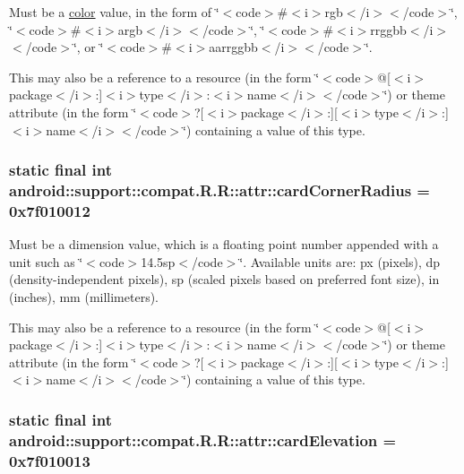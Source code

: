 Must be a \hyperlink{classandroid_1_1support_1_1compat_1_1_r_1_1color}{color} value, in the form of \char`\"{}$<$code$>$\#$<$i$>$rgb$<$/i$>$$<$/code$>$\char`\"{}, \char`\"{}$<$code$>$\#$<$i$>$argb$<$/i$>$$<$/code$>$\char`\"{}, \char`\"{}$<$code$>$\#$<$i$>$rrggbb$<$/i$>$$<$/code$>$\char`\"{}, or \char`\"{}$<$code$>$\#$<$i$>$aarrggbb$<$/i$>$$<$/code$>$\char`\"{}. 

This may also be a reference to a resource (in the form \char`\"{}$<$code$>$@\mbox{[}$<$i$>$package$<$/i$>$:\mbox{]}$<$i$>$type$<$/i$>$:$<$i$>$name$<$/i$>$$<$/code$>$\char`\"{}) or theme attribute (in the form \char`\"{}$<$code$>$?\mbox{[}$<$i$>$package$<$/i$>$:\mbox{]}\mbox{[}$<$i$>$type$<$/i$>$:\mbox{]}$<$i$>$name$<$/i$>$$<$/code$>$\char`\"{}) containing a value of this type. \hypertarget{classandroid_1_1support_1_1compat_1_1_r_1_1attr_078532727d38405f086f9c84c9c5c24a}{
\subsubsection[{cardCornerRadius}]{\setlength{\rightskip}{0pt plus 5cm}static final int android::support::compat.R.R::attr::cardCornerRadius = 0x7f010012}}
\label{classandroid_1_1support_1_1compat_1_1_r_1_1attr_078532727d38405f086f9c84c9c5c24a}


Must be a dimension value, which is a floating point number appended with a unit such as \char`\"{}$<$code$>$14.5sp$<$/code$>$\char`\"{}. Available units are: px (pixels), dp (density-independent pixels), sp (scaled pixels based on preferred font size), in (inches), mm (millimeters). 

This may also be a reference to a resource (in the form \char`\"{}$<$code$>$@\mbox{[}$<$i$>$package$<$/i$>$:\mbox{]}$<$i$>$type$<$/i$>$:$<$i$>$name$<$/i$>$$<$/code$>$\char`\"{}) or theme attribute (in the form \char`\"{}$<$code$>$?\mbox{[}$<$i$>$package$<$/i$>$:\mbox{]}\mbox{[}$<$i$>$type$<$/i$>$:\mbox{]}$<$i$>$name$<$/i$>$$<$/code$>$\char`\"{}) containing a value of this type. \hypertarget{classandroid_1_1support_1_1compat_1_1_r_1_1attr_f958e4b944c0650cd4d2431443007e30}{
\subsubsection[{cardElevation}]{\setlength{\rightskip}{0pt plus 5cm}static final int android::support::compat.R.R::attr::cardElevation = 0x7f010013}}
\label{classandroid_1_1support_1_1compat_1_1_r_1_1attr_f958e4b944c0650cd4d2431443007e30}


